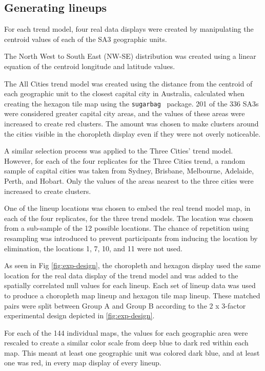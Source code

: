 \documentclass[journal]{vgtc}                     %
\begin{document}
\hypertarget{generating-lineups}{%
\subsection{Generating lineups}\label{generating-lineups}}

For each trend model, four real data displays were created by manipulating the centroid values of each of the SA3 geographic units.

The North West to South East (NW-SE) distribution was created using a linear equation of the centroid longitude and latitude values.

The All Cities trend model was created using the distance from the centroid of each geographic unit to the closest capital city in Australia, calculated when creating the hexagon tile map using the \texttt{sugarbag}~\cite{sugarbag} package.
201 of the 336 SA3s were considered greater capital city areas, and the values of these areas were increased to create red clusters. The amount was chosen to make clusters around the cities visible in the choropleth display even if they were not overly noticeable.

A similar selection process was applied to the Three Cities' trend model. However, for each of the four replicates for the Three Cities trend, a random sample of capital cities was taken from Sydney, Brisbane, Melbourne, Adelaide, Perth, and Hobart. Only the values of the areas nearest to the three cities were increased to create clusters.

One of the lineup locations was chosen to embed the real trend model map, in each of the four replicates, for the three trend models.
The location was chosen from a sub-sample of the 12 possible locations. The chance of repetition using resampling was introduced to prevent participants from inducing the location by elimination, the locations 1, 7, 10, and 11 were not used.

As seen in Fig \ref{fig:exp-design}, the choropleth and hexagon display used the same location for the real data display of the trend model and was added to the spatially correlated null values for each lineup.
Each set of lineup data was used to produce a choropleth map lineup and hexagon tile map lineup. These matched pairs were split between Group A and Group B according to the 2 x 3-factor experimental design depicted in \ref{fig:exp-design}.

For each of the 144 individual maps, the values for each geographic area were rescaled to create a similar color scale from deep blue to dark red within each map.
This meant at least one geographic unit was colored dark blue, and at least one was red, in every map display of every lineup.
\end{document}

